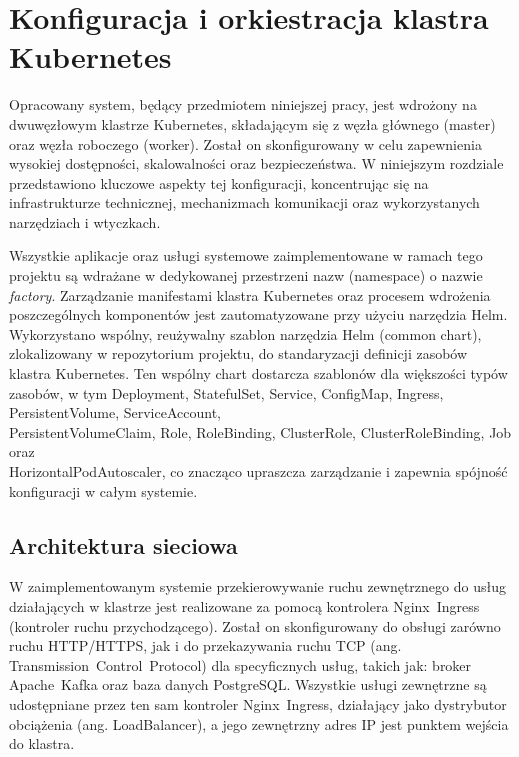 \section{Konfiguracja i orkiestracja klastra Kubernetes}
\label{chap:konfiguracja_kubernetes}

Opracowany system, będący przedmiotem niniejszej pracy, jest wdrożony na dwuwęzłowym klastrze Kubernetes, składającym się z węzła głównego (master) oraz węzła roboczego (worker). Został on skonfigurowany w celu zapewnienia wysokiej dostępności, skalowalności oraz bezpieczeństwa. W niniejszym rozdziale przedstawiono kluczowe aspekty tej konfiguracji, koncentrując się na infrastrukturze technicznej, mechanizmach komunikacji oraz wykorzystanych narzędziach i wtyczkach.

Wszystkie aplikacje oraz usługi systemowe zaimplementowane w ramach tego projektu są wdrażane w dedykowanej przestrzeni nazw (namespace) o nazwie \textit{factory}. Zarządzanie manifestami klastra Kubernetes oraz procesem wdrożenia poszczególnych komponentów jest zautomatyzowane przy użyciu narzędzia Helm. Wykorzystano wspólny, reużywalny szablon narzędzia Helm (common chart), zlokalizowany w repozytorium projektu, do standaryzacji definicji zasobów klastra Kubernetes. Ten wspólny chart dostarcza szablonów dla większości typów zasobów, w tym \mbox{Deployment}, \mbox{StatefulSet}, \mbox{Service}, \mbox{ConfigMap}, \mbox{Ingress}, \mbox{PersistentVolume},  \mbox{ServiceAccount}, \\ \mbox{PersistentVolumeClaim},  \mbox{Role}, \mbox{RoleBinding}, \mbox{ClusterRole},  \mbox{ClusterRoleBinding}, \mbox{Job} oraz \\ \mbox{HorizontalPodAutoscaler}, co znacząco upraszcza zarządzanie i zapewnia spójność konfiguracji w całym systemie.

\subsection{Architektura sieciowa}

W zaimplementowanym systemie przekierowywanie ruchu zewnętrznego do usług działających w klastrze jest realizowane za pomocą kontrolera \mbox{Nginx Ingress} (kontroler ruchu przychodzącego). Został on skonfigurowany do obsługi zarówno ruchu \mbox{HTTP/HTTPS}, jak i do przekazywania ruchu TCP (ang. \mbox{Transmission Control Protocol}) \cite{tanenbaum2011computer} dla specyficznych usług, takich jak: broker \mbox{Apache Kafka} oraz baza danych \mbox{PostgreSQL}. Wszystkie usługi zewnętrzne są udostępniane przez ten sam kontroler \mbox{Nginx Ingress}, działający jako dystrybutor obciążenia (ang. \mbox{LoadBalancer}), a jego zewnętrzny adres IP jest punktem wejścia do klastra.

